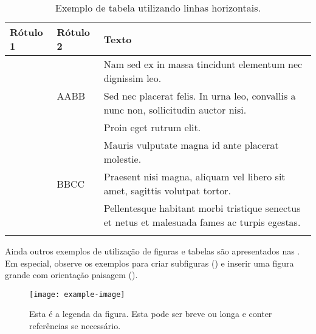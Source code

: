 \documentclass{textolivre}
\begin{document}
\begin{table}[htpb]
\caption{Exemplo de tabela utilizando linhas horizontais.}
\label{tbl02}
\begin{tabular}{llp{11cm}}
\toprule
Rótulo 1 & Rótulo 2 & Texto \\
\midrule
\arrayrulecolor[gray]{.7}
\multirow{6}{*}{AAAA} & \multirow{3}{*}{AABB} & Nam sed ex in massa tincidunt elementum nec dignissim leo.  \\
 \cmidrule{3-3}
 & & Sed nec placerat felis. In urna leo, convallis a nunc non, sollicitudin auctor nisi. \\
 \cmidrule{3-3}
 & & Proin eget rutrum elit. \\
 \cmidrule{2-3}
 & \multirow{3}{*}{BBCC} & Mauris vulputate magna id ante placerat molestie. \\
 \cmidrule{3-3}
 & & Praesent nisi magna, aliquam vel libero sit amet, sagittis volutpat tortor. \\
 \cmidrule{3-3}
 & & Pellentesque habitant morbi tristique senectus et netus et malesuada fames ac turpis egestas. \\
\arrayrulecolor{black}
\bottomrule
\end{tabular}
\end{table}


\lipsum[3]

Ainda outros exemplos de utilização de figuras e tabelas são apresentados nas . Em especial, observe os exemplos para criar subfiguras () e inserir uma figura grande com orientação paisagem ().

\begin{figure}[htbp]
\centering
\texttt{[image: example-image]}
\caption{Esta é a legenda da figura. Esta pode ser breve ou longa e conter referências se necessário.}
\label{fig:example}
\end{figure}

\lipsum[30-35]
\end{document}
